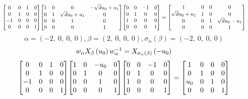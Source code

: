\documentclass[11pt]{article}
\theoremstyle{definition}
\begin{document}
\[
\scaletoalign{\textwidth}{{\left[\begin{matrix}0 & 0 & 1 & 0\\0 & 1 & 0 & 0\\-1 & 0 & 0 & 0\\0 & 0 & 0 & 1\end{matrix}\right]} {\left[\begin{matrix}1 & 0 & 0 & - \sqrt{d} u_{0} + u_{1}\\0 & 1 & \sqrt{d} u_{0} + u_{1} & 0\\0 & 0 & 1 & 0\\0 & 0 & 0 & 1\end{matrix}\right]} {\left[\begin{matrix}0 & 0 & -1 & 0\\0 & 1 & 0 & 0\\1 & 0 & 0 & 0\\0 & 0 & 0 & 1\end{matrix}\right]} = {\left[\begin{matrix}1 & 0 & 0 & 0\\\sqrt{d} u_{0} + u_{1} & 1 & 0 & 0\\0 & 0 & 1 & \sqrt{d} u_{0} - u_{1}\\0 & 0 & 0 & 1\end{matrix}\right]}}
\]
\[
\alpha = \left( -2, \  0, \  0, \  0\right), \beta = \left( 2, \  0, \  0, \  0\right), \sigma_{\alpha}(\beta) = \left( -2, \  0, \  0, \  0\right)
\]
\[
\scaletoalign{\textwidth}{w_{\alpha} X_{\beta}\left(u_{0}\right) w_{\alpha}^{-1} = X_{\sigma_{\alpha}\left(\beta\right)}\left(- u_{0}\right)}
\]
\[
\scaletoalign{\textwidth}{{\left[\begin{matrix}0 & 0 & 1 & 0\\0 & 1 & 0 & 0\\-1 & 0 & 0 & 0\\0 & 0 & 0 & 1\end{matrix}\right]} {\left[\begin{matrix}1 & 0 & - u_{0} & 0\\0 & 1 & 0 & 0\\0 & 0 & 1 & 0\\0 & 0 & 0 & 1\end{matrix}\right]} {\left[\begin{matrix}0 & 0 & -1 & 0\\0 & 1 & 0 & 0\\1 & 0 & 0 & 0\\0 & 0 & 0 & 1\end{matrix}\right]} = {\left[\begin{matrix}1 & 0 & 0 & 0\\0 & 1 & 0 & 0\\u_{0} & 0 & 1 & 0\\0 & 0 & 0 & 1\end{matrix}\right]}}
\]
\end{document}
